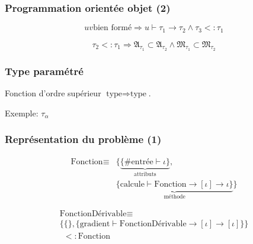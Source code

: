 \documentclass[14pt,utf8x,hyperref={pdfpagelabels=false}]{beamer}
\begin{document}
\begin{slideDecision}
  \begin{changeleftmargin}{1.1cm}
    \frametitle{Programmation orientée objet (2)}

    \begin{equation*}
      u v \text{bien formé} \Rightarrow u \vdash \tau_1 \rightarrow
      \tau_2 \wedge \tau_3 <: \tau_1
    \end{equation*}

    \begin{equation*}
      \tau_2 <: \tau_1 \Rightarrow
      \mathfrak{A_{\tau_1}} \subset \mathfrak{A_{\tau_2}} \wedge \mathfrak{M_{\tau_1}} \subset
      \mathfrak{M_{\tau_2}}
    \end{equation*}
  \end{changeleftmargin}
\end{slideDecision}

\begin{slideDecision}
  \begin{changeleftmargin}{1.1cm}
    \frametitle{Type paramétré}

    Fonction d'ordre supérieur $\text{type}
    \Rightarrow \text{type}$.

    \bigskip

    Exemple: $\tau_\alpha$
  \end{changeleftmargin}
\end{slideDecision}

\begin{slideDecision}
  \begin{changeleftmargin}{1.1cm}
    \frametitle{Représentation du problème (1)}

    \begin{equation*}
      \begin{array}{ll}
      \text{Fonction} \equiv & \{ \underbrace{\{ \#\text{entrée} \vdash
        \iota \}}_{\text{attributs}}, \\
      & \underbrace{\{ \text{calcule}
        \vdash \text{Fonction} \rightarrow[\iota] \rightarrow \iota \}}_{\text{méthode}} \}
      \end{array}
    \end{equation*}

    \begin{equation*}
      \begin{array}{l}
        \text{FonctionDérivable} \equiv \\
        \{ \{ \}, \{ \text{gradient}
      \vdash \text{FonctionDérivable} \rightarrow [\iota] \rightarrow [\iota] \} \}\\
      ~~<: \text{Fonction}
      \end{array}
    \end{equation*}

  \end{changeleftmargin}
\end{slideDecision}
\end{document}
